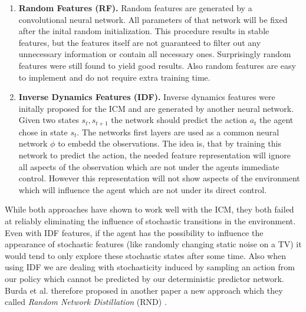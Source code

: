 \begin{enumerate}
  \item \textbf{Random Features (RF).} Random features are generated by a convolutional neural network. All parameters of that network will be fixed after the inital random initialization. This procedure results in stable features, but the features itself are not guaranteed to filter out any unnecessary information or contain all necessary ones. Surprisingly random features were still found to yield good results. Also random features are easy to implement and do not require extra training time.
  \item \textbf{Inverse Dynamics Features (IDF).} Inverse dynamics features were initally proposed for the ICM and are generated by another neural network. Given two states $s_t, s_{t+1}$ the network should predict the action $a_t$ the agent chose in state $s_t$. The networks first layers are used as a common neural network $\phi$ to embedd the observations. The idea is, that by training this network to predict the action, the needed feature representation will ignore all aspects of the observation which are not under the agents immediate control. However this representation will not show aspects of the environment which will influence the agent which are not under its direct control.
\end{enumerate}

While both approaches have shown to work well with the ICM, they both failed at reliably eliminating the influence of stochastic transitions in the environment. Even with IDF features, if the agent has the possibility to influence the appearance of stochastic features (like randomly changing static noise on a TV) it would tend to only explore these stochastic states after some time. Also when using IDF we are dealing with stochasticity induced by sampling an action from our policy which cannot be predicted by our deterministic predictor network. Burda et al. therefore proposed in another paper a new approach which they called \textit{Random Network Distillation} (RND) \cite{burda2018exploration}.

